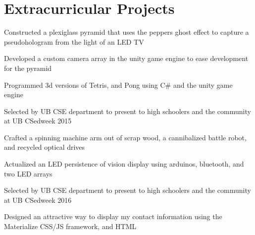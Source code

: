 \documentclass[]{deedy-resume-openfont}
\begin{document}
\begin{minipage}[t]{0.66\textwidth} 


\section{Extracurricular Projects}

\vspace{\topsep} %
\begin{tightemize}\item Constructed a plexiglass pyramid that uses the peppers ghost effect to capture a pseudohologram from the light of an LED TV \item Developed a custom camera array in the unity game engine to ease development for the pyramid \item Programmed 3d versions of Tetris, and Pong using C\# and the unity game engine \item Selected by UB CSE department to present to high schoolers and the community at UB CSedweek 2015
\end{tightemize}
\sectionsep

\begin{tightemize}
\item Crafted a spinning machine arm out of scrap wood, a cannibalized battle robot, and recycled optical drives\item Actualized an LED persistence of vision display using arduinos, bluetooth, and two LED arrays\item Selected by UB CSE department to present to high schoolers and the community at UB CSedweek 2016 \end{tightemize}
\sectionsep

\begin{tightemize}
\item Designed an attractive way to display my contact information using the Materialize CSS/JS framework, and HTML\end{tightemize}
\sectionsep


\end{minipage}
\end{document}
